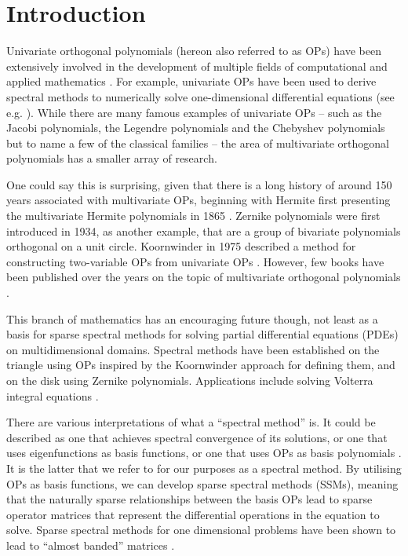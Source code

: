 
\chapter{Introduction}

Univariate orthogonal polynomials (hereon also referred to as OPs) have been extensively involved in the development of multiple fields of computational and applied mathematics \cite{onedimopsrefs} . For example, univariate OPs have been used to derive spectral methods to numerically solve one-dimensional differential equations (see e.g. \cite{boyd2001chebyshev, olver2013fast} ). While there are many famous examples of univariate OPs -- such as the Jacobi polynomials, the Legendre polynomials and the Chebyshev polynomials but to name a few of the classical families \cite[Section 18.3]{DLMF} -- the area of multivariate orthogonal polynomials has a smaller array of research. 

One could say this is surprising, given that there is a long history of around 150 years associated with multivariate OPs, beginning with Hermite first presenting the multivariate Hermite polynomials in 1865 \cite{appel1926fonctions, ismail2017review}. Zernike polynomials \cite{zernike1934diffraction} were first introduced in 1934, as another example, that are a group of bivariate polynomials orthogonal on a unit circle. Koornwinder in 1975 described a method for constructing two-variable OPs from univariate OPs \cite{koornwinder1975two}. However, few books have been published over the years on the topic of multivariate orthogonal polynomials \cite{dunkl2014orthogonal}.

This branch of mathematics has an encouraging future though, not least as a basis for sparse spectral methods for solving partial differential equations (PDEs) on multidimensional domains. Spectral methods have been established on the triangle \cite{olver2019triangle} using OPs inspired by the Koornwinder approach for defining them, and on the disk \cite{vasil2016tensor} using Zernike polynomials. Applications include solving Volterra integral equations \cite{gutleb2020sparse}. 

There are various interpretations of what a \enquote{spectral method} is. It could be described as one that achieves spectral convergence of its solutions, or one that uses eigenfunctions as basis functions, or one that uses OPs as basis polynomials \cite{}. It is the latter that we refer to for our purposes as a spectral method. By utilising OPs as basis functions, we can develop sparse spectral methods (SSMs), meaning that the naturally sparse relationships between the basis OPs lead to sparse operator matrices that represent the differential operations in the equation to solve. Sparse spectral methods for one dimensional problems have been shown to lead to \enquote{almost banded} matrices \cite{olver2013fast}. 

